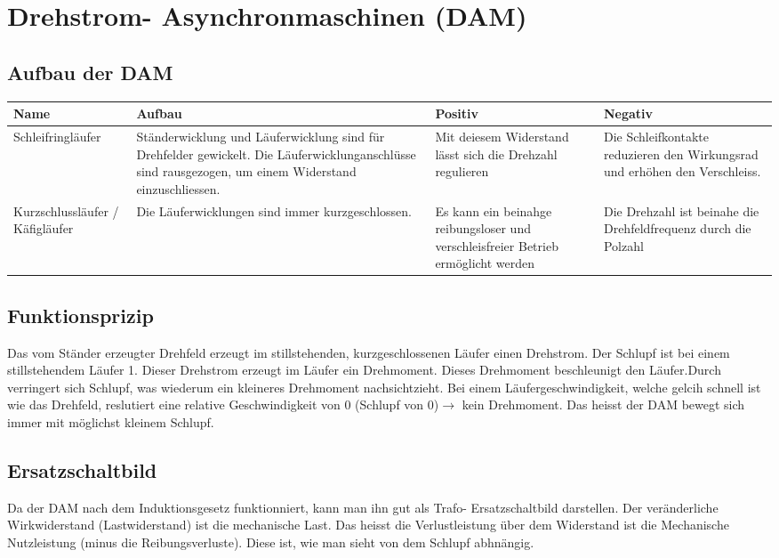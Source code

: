 \section{Drehstrom- Asynchronmaschinen (DAM)}
    \subsection{Aufbau der DAM}
        \begin{tabular}[c]{| p{3cm} | p{5cm} | p{4cm} | p{5cm} |}
            \hline
            Name &
            Aufbau &
            Positiv &
            Negativ \\
            \hline
            Schleifringläufer &
            Ständerwicklung und Läuferwicklung sind für Drehfelder gewickelt. Die Läuferwicklunganschlüsse sind rausgezogen, um einem Widerstand einzuschliessen. &
            Mit deiesem Widerstand lässt sich die Drehzahl regulieren &
            Die Schleifkontakte reduzieren den Wirkungsrad und erhöhen den Verschleiss. \\
            \hline
            Kurzschlussläufer / Käfigläufer &
            Die Läuferwicklungen sind immer kurzgeschlossen. &
            Es kann ein beinahge reibungsloser und verschleisfreier Betrieb ermöglicht werden &
            Die Drehzahl ist beinahe die Drehfeldfrequenz durch die Polzahl \\
            \hline
        \end{tabular}
    \subsection{Funktionsprizip}
        Das vom Ständer erzeugter Drehfeld erzeugt im stillstehenden, kurzgeschlossenen Läufer einen Drehstrom. Der Schlupf ist bei einem stillstehendem Läufer 1. Dieser Drehstrom erzeugt im Läufer ein Drehmoment. Dieses Drehmoment beschleunigt den Läufer.Durch verringert sich Schlupf, was wiederum ein kleineres Drehmoment nachsichtzieht. Bei einem Läufergeschwindigkeit, welche gelcih schnell ist wie das Drehfeld, reslutiert eine relative Geschwindigkeit von 0 (Schlupf von 0)$\rightarrow $ kein Drehmoment. Das heisst der DAM bewegt sich immer mit möglichst kleinem Schlupf.

    \subsection{Ersatzschaltbild}
        Da der DAM nach dem Induktionsgesetz funktionniert, kann man ihn gut als Trafo- Ersatzschaltbild darstellen. Der veränderliche Wirkwiderstand (Lastwiderstand) ist die mechanische Last. Das heisst die Verlustleistung über dem Widerstand ist die Mechanische Nutzleistung (minus die Reibungsverluste). Diese ist, wie man sieht von dem Schlupf abhnängig.

